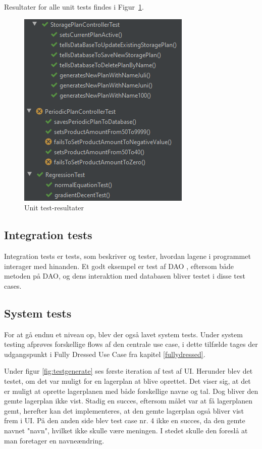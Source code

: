 Resultater for alle unit tests findes i Figur~\ref{fig:unittestresults}.

\begin{figure}
    \centering
    \includegraphics[scale=1]{figures/tests/unittestresults}
    \caption{Unit test-resultater \label{fig:unittestresults}}
\end{figure}

\subsection{Integration tests}
Integration tests er tests, som beskriver og tester, hvordan lagene i programmet interager med hinanden. Et godt eksempel er test af DAO \cite{DAO}, eftersom både metoden på DAO, og dens interaktion med databasen bliver testet i disse test cases.

\subsection{System tests}
For at gå endnu et niveau op, blev der også lavet system tests\cite{TestLevels}. Under system testing afprøves forskellige flows af den centrale use case, i dette tilfælde tages der udgangspunkt i Fully Dressed Use Case fra kapitel \ref{fullydressed}.

Under figur \ref{fig:testgenerate} ses første iteration af test af UI. Herunder blev det testet, om det var muligt for en lagerplan at blive oprettet. Det viser sig, at det er muligt at oprette lagerplanen med både forskellige navne og tal. Dog bliver den gemte lagerplan ikke vist. Stadig en succes, eftersom målet var at få lagerplanen gemt, herefter kan det implementeres, at den gemte lagerplan også bliver vist frem i UI. På den anden side blev test case nr. 4 ikke en succes, da den gemte navnet "navn", hvilket ikke skulle være meningen. I stedet skulle den foreslå at man foretager en navneændring.

